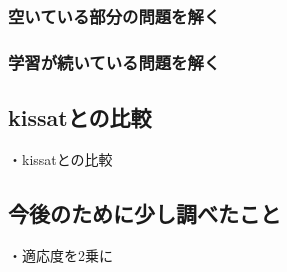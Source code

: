 \subsubsection{空いている部分の問題を解く}



\subsubsection{学習が続いている問題を解く}



\subsection{kissatとの比較}%

・kissatとの比較



\subsection{今後のために少し調べたこと}

・適応度を2乗に
